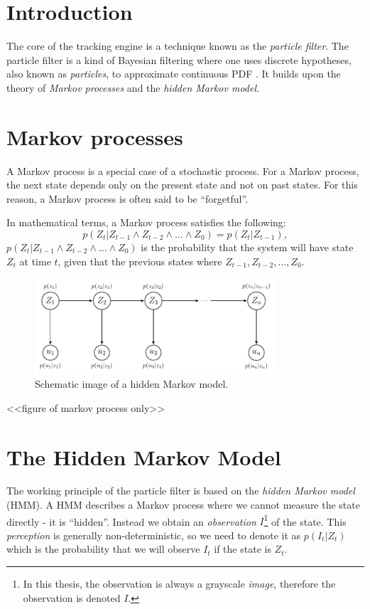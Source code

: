 \section{Introduction}
The core of the tracking engine is a technique known as the \emph{particle filter}. 
The particle filter is a kind of Bayesian filtering where one uses discrete hypotheses, 
also known as \emph{particles}, to approximate continuous PDF \cite{ProbRob}.
It builds upon the theory of \emph{Markov processes} and the \emph{hidden Markov model}.

\section{Markov processes}
A Markov process is a special case of a stochastic process. For a Markov process, 
the next state depends only on the present state and not on past states. 
For this reason, a Markov process is often said to be ``forgetful''.

In mathematical terms, a Markov process satisfies the following:
\begin{equation}
 p\left(Z_t|Z_{t-1} \wedge Z_{t-2} \wedge \dots \wedge Z_0\right) = p\left(Z_t|Z_{t-1}\right),
\end{equation}
$p\left(Z_t|Z_{t-1} \wedge Z_{t-2} \wedge \dots \wedge Z_0\right)$ 
is the probability that the system will have state $Z_t$ at time $t$, 
given that the previous states where $Z_{t-1}, Z_{t-2},\dots, Z_0$.

\begin{figure}
  \centering
  \includegraphics[width=0.8\textwidth]{hmm-graph.pdf}
  \caption{Schematic image of a hidden Markov model.}
  \label{fig:hmm-graph}
\end{figure}

<<figure of markov process only>>

\section{The Hidden Markov Model}

The working principle of the particle filter is based on the \emph{hidden Markov model} (HMM).
A HMM describes a Markov process where we cannot measure the state directly - it is ``hidden''\cite{EncyclopediaMachineLearning}.
Instead we obtain an \emph{observation} $I$\footnote{In this thesis, the observation is always a grayscale \emph{image}, 
therefore the observation is denoted $I$.}  of the state. This \emph{perception} is generally non-deterministic, 
so we need to denote it as $p(I_t|Z_t)$ which is the probability that we will observe $I_t$ if the state is $Z_t$.

